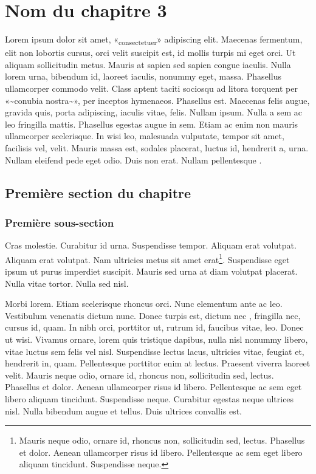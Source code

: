\hypertarget{nom-du-chapitre-3}{%
\chapter{Nom du chapitre 3}\label{nom-du-chapitre-3}}

Lorem ipsum dolor sit amet, «\textsubscript{consectetuer}» adipiscing
elit. Maecenas fermentum, elit non lobortis cursus, orci velit suscipit
est, id mollis turpis mi eget orci. Ut aliquam sollicitudin metus.
Mauris at sapien sed sapien congue iaculis. Nulla lorem urna, bibendum
id, laoreet iaculis, nonummy eget, massa. Phasellus ullamcorper commodo
velit. Class aptent taciti sociosqu ad litora torquent per
«\textasciitilde conubia nostra\textasciitilde», per inceptos hymenaeos.
Phasellus est. Maecenas felis augue, gravida quis, porta adipiscing,
iaculis vitae, felis. Nullam ipsum. Nulla a sem ac leo fringilla mattis.
Phasellus egestas augue in sem. Etiam ac enim non mauris ullamcorper
scelerisque. In wisi leo, malesuada vulputate, tempor sit amet,
facilisis vel, velit. Mauris massa est, sodales placerat, luctus id,
hendrerit a, urna. Nullam eleifend pede eget odio. Duis non erat. Nullam
pellentesque \autocite{Doule1887}.

\hypertarget{premiuxe8re-section-du-chapitre}{%
\section{Première section du
chapitre}\label{premiuxe8re-section-du-chapitre}}

\hypertarget{premiuxe8re-sous-section}{%
\subsection{Première sous-section}\label{premiuxe8re-sous-section}}

Cras molestie. Curabitur id urna. Suspendisse tempor. Aliquam erat
volutpat. Aliquam erat volutpat. Nam ultricies metus sit amet
erat\footnote{Mauris neque odio, ornare id, rhoncus non, sollicitudin sed, lectus. Phasellus et dolor. Aenean ullamcorper risus id libero. Pellentesque ac sem eget libero aliquam tincidunt. Suspendisse neque.}.
Suspendisse eget ipsum ut purus imperdiet suscipit. Mauris sed urna at
diam volutpat placerat. Nulla vitae tortor. Nulla sed nisl.

Morbi lorem. Etiam scelerisque rhoncus orci. Nunc elementum ante ac leo.
Vestibulum venenatis dictum nunc. Donec turpis est, dictum nec
\autocite{Drocher2006}, fringilla nec, cursus id, quam. In nibh orci,
porttitor ut, rutrum id, faucibus vitae, leo. Donec ut wisi. Vivamus
ornare, lorem quis tristique dapibus, nulla nisl nonummy libero, vitae
luctus sem felis vel nisl. Suspendisse lectus lacus, ultricies vitae,
feugiat et, hendrerit in, quam. Pellentesque porttitor enim at lectus.
Praesent viverra laoreet velit. Mauris neque odio, ornare id, rhoncus
non, sollicitudin sed, lectus. Phasellus et dolor. Aenean ullamcorper
risus id libero. Pellentesque ac sem eget libero aliquam tincidunt.
Suspendisse neque. Curabitur egestas neque ultrices nisl. Nulla bibendum
augue et tellus. Duis ultrices convallis est.

